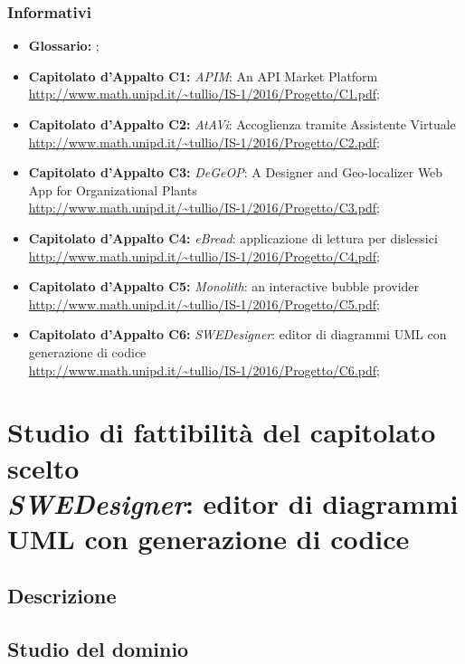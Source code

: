 		\subsubsection{Informativi}
		\begin{itemize}
			\item \textbf{Glossario: }\emph{\Glossario};
			\item \textbf{Capitolato d'Appalto C1: } \emph{APIM}: An API Market Platform
			\\ \url{http://www.math.unipd.it/~tullio/IS-1/2016/Progetto/C1.pdf};
			\item \textbf{Capitolato d'Appalto C2: } \emph{AtAVi}: Accoglienza tramite Assistente Virtuale
			\\ \url{http://www.math.unipd.it/~tullio/IS-1/2016/Progetto/C2.pdf};
			\item \textbf{Capitolato d'Appalto C3: } \emph{DeGeOP}: A Designer and Geo-localizer Web App for Organizational Plants
			\\ \url{http://www.math.unipd.it/~tullio/IS-1/2016/Progetto/C3.pdf};
			\item \textbf{Capitolato d'Appalto C4: } \emph{eBread}: applicazione di lettura per dislessici
			\\ \url{http://www.math.unipd.it/~tullio/IS-1/2016/Progetto/C4.pdf};
			\item \textbf{Capitolato d'Appalto C5: } \emph{Monolith}: an interactive bubble provider
			\\ \url{http://www.math.unipd.it/~tullio/IS-1/2016/Progetto/C5.pdf};
			\item \textbf{Capitolato d'Appalto C6: } \emph{SWEDesigner}: editor di diagrammi UML con generazione di codice
			\\ \url{http://www.math.unipd.it/~tullio/IS-1/2016/Progetto/C6.pdf};
		\end{itemize}
\newpage
	
\section{Studio di fattibilità del capitolato scelto\\ \emph{SWEDesigner}: editor di diagrammi UML con generazione di codice}
	\subsection{Descrizione}
	\subsection{Studio del dominio}
